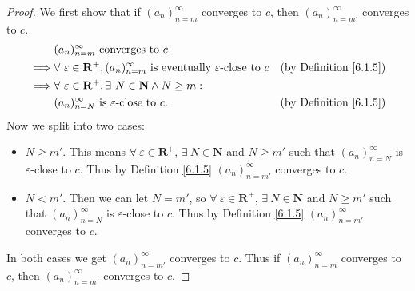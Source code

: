 \begin{proof}
    We first show that if \((a_n)_{n = m}^\infty\) converges to \(c\), then \((a_n)_{n = m'}^\infty\) converges to \(c\).
    \begin{align*}
                 & (a_n)_{n = m}^\infty \text{ converges to } c                                                                                                           \\
        \implies & \forall\ \varepsilon \in \mathbf{R}^+, (a_n)_{n = m}^\infty \text{ is eventually } \varepsilon\text{-close to } c & \text{(by Definition \ref{6.1.5})} \\
        \implies & \forall\ \varepsilon \in \mathbf{R}^+, \exists\ N \in \mathbf{N} \land N \geq m :                                                                      \\
                 & (a_n)_{n = N}^\infty \text{ is } \varepsilon\text{-close to } c.                                                  & \text{(by Definition \ref{6.1.5})}
    \end{align*}
    Now we split into two cases:
    \begin{itemize}
        \item \(N \geq m'\).
              This means \(\forall\ \varepsilon \in \mathbf{R}^+\), \(\exists\ N \in \mathbf{N}\) and \(N \geq m'\) such that \((a_n)_{n = N}^\infty\) is \(\varepsilon\)-close to \(c\).
              Thus by Definition \ref{6.1.5} \((a_n)_{n = m'}^\infty\) converges to \(c\).
        \item \(N < m'\).
              Then we can let \(N = m'\), so \(\forall\ \varepsilon \in \mathbf{R}^+\), \(\exists\ N \in \mathbf{N}\) and \(N \geq m'\) such that \((a_n)_{n = N}^\infty\) is \(\varepsilon\)-close to \(c\).
              Thus by Definition \ref{6.1.5} \((a_n)_{n = m'}^\infty\) converges to \(c\).
    \end{itemize}
    In both cases we get \((a_n)_{n = m'}^\infty\) converges to \(c\).
    Thus if \((a_n)_{n = m}^\infty\) converges to \(c\), then \((a_n)_{n = m'}^\infty\) converges to \(c\).


\end{proof}
